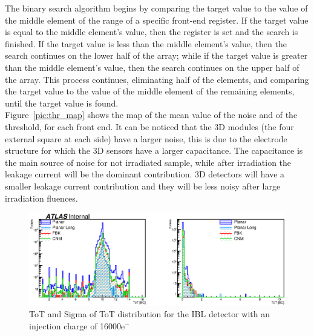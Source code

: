 
The binary search algorithm begins by comparing the target value to the value of the middle element of the range of a specific front-end register. If the target value is equal to the middle element's value, then the register is set and the search is finished. If the target value is less than the middle element's value, then the search continues on the lower half of the array; while if the target value is greater than the middle element's value, then the search continues on the upper half of the array. This process continues, eliminating half of the elements, and comparing the target value to the value of the middle element of the remaining elements, until the target value is found.\\
Figure~\ref{pic:thr_map} shows the map of the mean value of the noise and of the threshold, for each front end. It can be noticed that the 3D modules (the four external square at each side) have a larger noise, this is due to the electrode structure for which the 3D sensors have a larger capacitance. The capacitance is the main source of noise for not irradiated sample, while after irradiation the leakage current will be the dominant contribution. 3D detectors will have a smaller leakage current contribution and they will be less noisy after large irradiation fluences.\\



\begin{figure}
\centering
\includegraphics[width=1.\textwidth]{Images/IBL_commissioning/ToTDistro49450.eps}
\caption{ ToT and Sigma of ToT distribution for the IBL detector with an injection charge of 16000e$^-$}
\label{pic:tot_map}
\end{figure}

